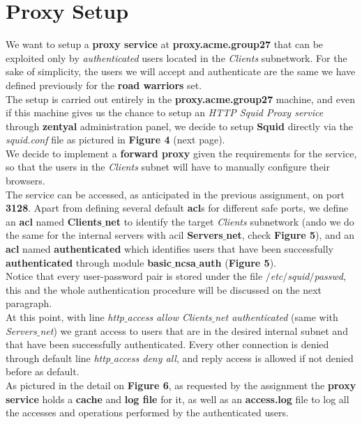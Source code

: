 \section{Proxy Setup}
We want to setup a \textbf{proxy service} at \textbf{proxy.acme.group27} that can be exploited only by \textit{authenticated} users located in the \textit{Clients} subnetwork. For the sake of simplicity, the users we will accept and authenticate are the same we have defined previously for the \textbf{road warriors} set.\\
The setup is carried out entirely in the \textbf{proxy.acme.group27} machine, and even if this machine gives us the chance to setup an \textit{HTTP Squid Proxy service} through \textbf{zentyal} administration panel, we decide to setup \textbf{Squid} directly via the \textit{squid.conf} file as pictured in \textbf{Figure 4} (next page).\\
We decide to implement a \textbf{forward proxy} given the requirements for the service, so that the users in the \textit{Clients} subnet will have to manually configure their browsers.\\
The service can be accessed, as anticipated in the previous assignment, on port \textbf{3128}. Apart from defining several default \textbf{acl}s for different safe ports, we define an \textbf{acl} named \textbf{Clients$\_$net} to identify the target \textit{Clients} subnetwork (ando we do the same for the internal servers with acil \textbf{Servers$\_$net}, check \textbf{Figure 5}), and an \textbf{acl} named \textbf{authenticated} which identifies users that have been successfully \textbf{authenticated} through module \textbf{basic$\_$ncsa$\_$auth} (\textbf{Figure 5}).\\
Notice that every user-password pair is stored under the file \textit{$/$etc$/$squid$/$passwd}, this and the whole authentication procedure will be discussed on the next paragraph.\\
At this point, with line \textit{http$\_$access allow Clients$\_$net authenticated} (same with \textit{Servers$\_$net}) we grant access to users that are in the desired internal subnet and that have been successfully authenticated. Every other connection is denied through default line \textit{http$\_$access deny all}, and reply access is allowed if not denied before as default.\\
As pictured in the detail on \textbf{Figure 6}, as requested by the assignment the \textbf{proxy service} holds a \textbf{cache} and \textbf{log file} for it, as well as an \textbf{access.log} file to log all the accesses and operations performed by the authenticated users.\\
